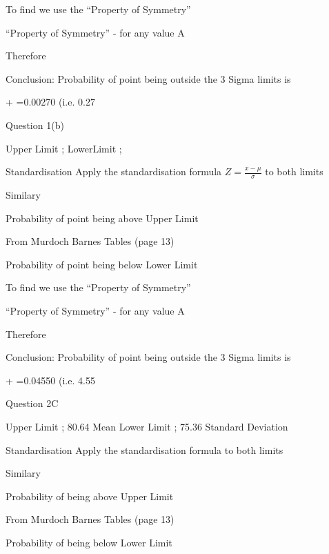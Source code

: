 ﻿\documentclass[]{report}
\begin{document}
To find   we use the “Property of Symmetry”

“Property of Symmetry” -   for any value A

Therefore 

Conclusion: 
Probability of point being outside the 3 Sigma limits is

+ =0.00270 	(i.e. 0.27%
















Question 1(b)

Upper Limit ;  
LowerLimit ;  

Standardisation
Apply the standardisation formula	$Z=\frac{x-\mu}{\sigma} $ 	to both limits


Similary



Probability of point being above Upper Limit

From Murdoch Barnes Tables (page 13)  

Probability of point being below Lower Limit


To find   we use the “Property of Symmetry”

“Property of Symmetry” -   for any value A

Therefore 

Conclusion: 
Probability of point being outside the 3 Sigma limits is

+ =0.04550 	(i.e. 4.55%
















Question 2C

Upper Limit ; 80.64		Mean		 	
Lower Limit ; 75.36		Standard Deviation	 

Standardisation
Apply the standardisation formula	 	to both limits


Similary



Probability of being above Upper Limit

From Murdoch Barnes Tables (page 13)  

Probability of being below Lower Limit
\end{document}
